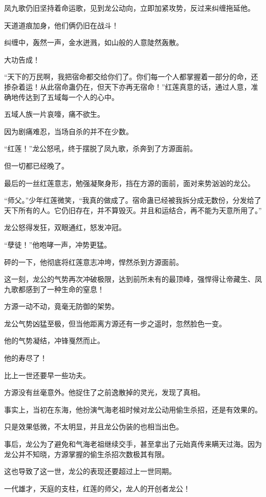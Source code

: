 \begin{this_body}
凤九歌仍旧坚持着命运歌，见到龙公动向，立即加紧攻势，反过来纠缠拖延他。

天道道痕加身，他们俩仍旧在战斗！

纠缠中，轰然一声，金水迸溅，如山般的人意陡然轰散。

大功告成！

“天下的万民啊，我把宿命都交给你们了。你们每一个人都掌握着一部分的命，还掺杂着运！从此宿命蛊仍在，但天下亦再无宿命！”红莲真意的话，通过人意，准确地传达到了五域每一个人的心中。

五域人族一片哀嚎，痛不欲生。

因为剧痛难忍，当场自杀的并不在少数。

“红莲！”龙公怒吼，终于摆脱了凤九歌，杀奔到了方源面前。

但一切都已经晚了。

最后的一丝红莲意志，勉强凝聚身形，挡在方源的面前，面对来势汹汹的龙公。

“师父。”少年红莲微笑，“我真的做成了。宿命蛊已经被我拆分成无数份，分发给了天下所有的人。它仍旧存在，并不算毁灭。并且和运结合，再不能为天意所用了。”

龙公怒得发狂，双眼通红，怒发冲冠。

“孽徒！”他咆哮一声，冲势更猛。

砰的一下，他彻底将红莲意志冲垮，悍然杀到方源面前。

这一刻，龙公的气势再次冲破极限，达到前所未有的最顶峰，强悍得让帝藏生、凤九歌都感到了一种生命的窒息！

方源一动不动，竟毫无防御的架势。

龙公气势凶猛至极，但当他距离方源还有一步之遥时，忽然脸色一变。

他的气势凝结，冲锋戛然而止。

他的寿尽了！

比上一世还要早一些功夫。

方源没有丝毫意外。他捉住了之前逸散掉的灵光，发现了真相。

事实上，当初在东海，他扮演气海老祖时候对龙公动用偷生杀招，还是有效果的。

只是效果低微，不太明显，并且龙公伪装的也相当出色。

事后，龙公为了避免和气海老祖继续交手，甚至拿出了元始真传来瞒天过海。因为龙公并不知晓，方源掌握的偷生杀招次数极其有限。

这也导致了这一世，龙公的表现还要超过上一世同期。

一代雄才，天庭的支柱，红莲的师父，龙人的开创者龙公！


\end{this_body}
